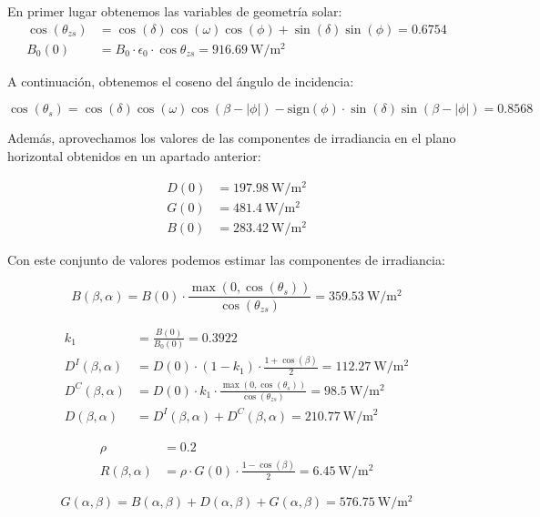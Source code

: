 \begin{itemize}
  En primer lugar obtenemos las variables de geometría solar:
  \begin{align*}
    \cos(\theta_{zs}) &= \cos(\delta) \cos(\omega) \cos(\phi) + \sin(\delta) \sin(\phi) = 0.6754\\
    B_{0}(0) &=B_{0}\cdot\epsilon_{0}\cdot\cos\theta_{zs} = \SI{916.69}{\watt\per\meter\squared}
  \end{align*}

  A continuación, obtenemos el coseno del ángulo de incidencia:

\[
  \cos(\theta_{s}) = \cos(\delta)\cos(\omega)\cos(\beta-|\phi|)-
  \mathrm{sign}(\phi)\cdot\sin(\delta)\sin(\beta-|\phi|) = 0.8568
\]

Además, aprovechamos los valores de las componentes de irradiancia en
el plano horizontal obtenidos en un apartado anterior:

\begin{align*}
  D(0) &= \SI{197.98}{\watt\per\meter\squared}\\
  G(0) &= \SI{481.4}{\watt\per\meter\squared}\\
  B(0) &= \SI{283.42}{\watt\per\meter\squared}
\end{align*}

Con este conjunto de valores podemos estimar las componentes de
irradiancia:

\[
  B(\beta,\alpha) =
  B(0)\cdot\frac{\max(0,\cos(\theta_{s}))}{\cos(\theta_{zs})} =
  \SI{359.53}{\watt\per\meter\squared}
\]

\begin{align*}
  k_{1} &= \frac{B(0)}{B_{0}(0)} = 0.3922\\
  D^{I}(\beta,\alpha) &= D(0) \cdot (1-k_{1}) \cdot \frac{1 + \cos(\beta)}{2} = \SI{112.27}{\watt\per\meter\squared}\\
  D^{C}(\beta,\alpha) &= D(0) \cdot k_{1} \cdot \frac{\max(0,\cos(\theta_{s}))}{\cos(\theta_{zs})} = \SI{98.5}{\watt\per\meter\squared}\\
  D(\beta,\alpha) &= D^{I}(\beta,\alpha)+D^{C}(\beta,\alpha) = \SI{210.77}{\watt\per\meter\squared}
\end{align*}

\begin{align*}
  \rho &= 0.2\\
  R(\beta,\alpha) &= \rho\cdot G(0)\cdot\frac{1-\cos(\beta)}{2} = \SI{6.45}{\watt\per\meter\squared}
\end{align*}

\[
  G(\alpha,\beta) = B(\alpha, \beta) + D(\alpha, \beta) + G(\alpha,
  \beta) = \SI{576.75}{\watt\per\meter\squared}
\]
\end{itemize}

